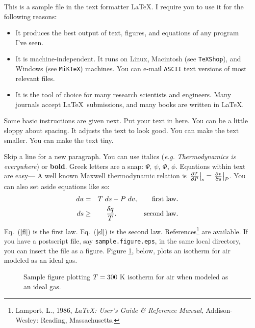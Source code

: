 \documentclass{article}
\begin{document}

\medskip
This is a sample file in the text formatter \LaTeX.
I require you to use it for the following reasons:

\begin{itemize}

\item{It produces the best output of text, figures,
      and equations of any
      program I've seen.}

\item{It is machine-independent. It runs on Linux, Macintosh (see {\tt TeXShop}), and Windows (see {\tt MiKTeX}) machines. 
     You can e-mail {\tt ASCII} text versions of most relevant files.}

\item{It is the tool of choice for many research
     scientists and engineers.
     Many journals accept 
     \LaTeX~submissions, and many books
     are written in \LaTeX.}

\end{itemize}
\medskip
Some basic instructions are given next.
Put your text in here.  You can be a little sloppy    about
spacing.  It adjusts the text to look good.
{\small You can make the text smaller.}
{\tiny You can make the text tiny.}

Skip a line for a new paragraph.   
You can use italics ({\em e.g.} {\em  Thermodynamics is everywhere}) or {\bf bold}.
Greek letters are a snap: $\Psi$, $\psi$,
$\Phi$, $\phi$.  Equations within text are easy---
A well known Maxwell thermodynamic relation is
$\left.{\partial T \over \partial P}\right|_{s} = 
\left.{\partial v \over \partial s}\right|_{P}$.
You can also set aside equations like so:
\begin{eqnarray}
du &=& T\ ds -P\ dv, \qquad \mbox{first law.}\label{fl}\\
ds &\ge& {\delta q \over T}.\qquad  \qquad \mbox{second law.} \label{sl}
\end{eqnarray}
Eq.~(\ref{fl}) is the first law.
Eq.~(\ref{sl}) is the second law.
References\footnote{Lamport, L., 1986, {\em \LaTeX: User's Guide \& Reference Manual},
    Addison-Wesley: Reading, Massachusetts.}
are available. 
If you have a postscript file, say {\tt sample.figure.eps}, in the same local directory,
you can insert the file as a figure.  Figure \ref{sample}, below, plots an isotherm for air modeled as an ideal gas. 
\begin{figure}[ht]
\epsfxsize=2.5in
\centerline{}
\caption{Sample figure plotting $T=300~{\rm K}$ isotherm for air when modeled as an ideal gas.}
\label{sample}
\end{figure}
\end{document}
